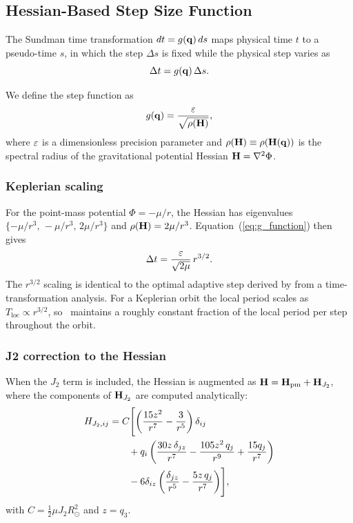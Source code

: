 \subsection{Hessian-Based Step Size Function}
\label{sec:stepsize}

The Sundman time transformation $dt = g(\mathbf{q})\,ds$ maps physical
time $t$ to a pseudo-time $s$, in which the step $\Delta s$ is
fixed while the physical step varies as
\begin{equation}
  \Delta t = g(\mathbf{q})\,\Delta s.
  \label{eq:sundman}
\end{equation}

We define the step function as
\begin{equation}
  g(\mathbf{q}) = \frac{\varepsilon}{\sqrt{\rho(\mathbf{H})}},
  \label{eq:g_function}
\end{equation}
where $\varepsilon$ is a dimensionless precision parameter and
$\rho(\mathbf{H}) \equiv \rho\!\left(\mathbf{H}(\mathbf{q})\right)$
is the spectral radius of the gravitational potential Hessian
$\mathbf{H} = \nabla^2\Phi$.

\subsubsection{Keplerian scaling}
\label{sec:keplerian_scaling}

For the point-mass potential $\Phi = -\mu/r$, the Hessian has
eigenvalues $\{-\mu/r^3,\,-\mu/r^3,\,2\mu/r^3\}$ and
$\rho(\mathbf{H}) = 2\mu/r^3$. Equation~(\ref{eq:g_function}) then gives
\begin{equation}
  \Delta t = \frac{\varepsilon}{\sqrt{2\mu}}\,r^{3/2}.
  \label{eq:dt_keplerian}
\end{equation}
The $r^{3/2}$ scaling is identical to the optimal adaptive step
derived by \citet{PretoTremaine1999} from a time-transformation
analysis. For a Keplerian orbit the local period scales as
$T_{\mathrm{loc}} \propto r^{3/2}$, so \AAS\ maintains a roughly
constant fraction of the local period per step throughout the orbit.

\subsubsection{J2 correction to the Hessian}
\label{sec:j2_hessian}

When the $J_2$ term is included, the Hessian is augmented as
$\mathbf{H} = \mathbf{H}_{\mathrm{pm}} + \mathbf{H}_{J_2}$, where the
components of $\mathbf{H}_{J_2}$ are computed analytically:
\begin{align}
  H_{J_2,ij} &= C\Biggl[
      \left(\frac{15z^2}{r^7} - \frac{3}{r^5}\right)\delta_{ij}
      \notag \\
    &\qquad + q_i\left(\frac{30z\,\delta_{jz}}{r^7}
      - \frac{105z^2\,q_j}{r^9} + \frac{15q_j}{r^7}\right)
      \notag \\
    &\qquad - 6\delta_{iz}\left(\frac{\delta_{jz}}{r^5}
      - \frac{5z\,q_j}{r^7}\right)
    \Biggr],
  \label{eq:j2_hessian}
\end{align}
with $C = \tfrac{1}{2}\mu J_2 R_\odot^2$ and $z = q_3$.

